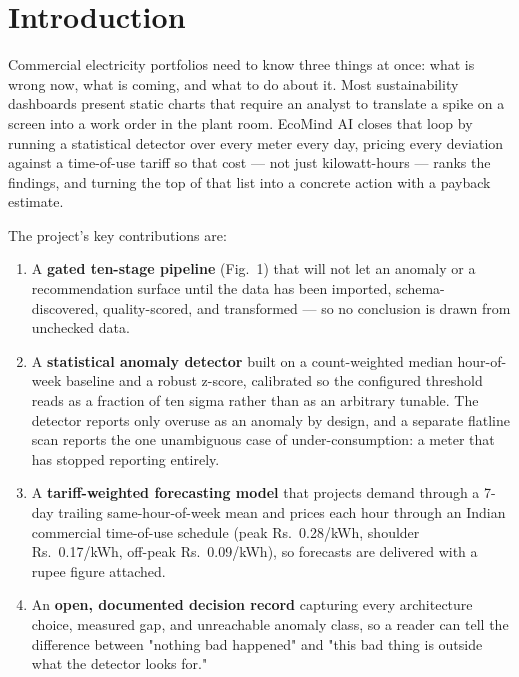 \documentclass[conference, 10pt, a4paper]{IEEEtran}
\begin{document}
\section{Introduction}

Commercial electricity portfolios need to know three things at once: what is
wrong now, what is coming, and what to do about it. Most sustainability
dashboards present static charts that require an analyst to translate a spike
on a screen into a work order in the plant room. EcoMind AI closes that loop
by running a statistical detector over every meter every day, pricing every
deviation against a time-of-use tariff so that cost — not just kilowatt-hours —
ranks the findings, and turning the top of that list into a concrete action
with a payback estimate.

The project's key contributions are:

\begin{enumerate}
\item A \textbf{gated ten-stage pipeline} (Fig.~1) that will not let an
anomaly or a recommendation surface until the data has been imported, schema-
discovered, quality-scored, and transformed — so no conclusion is drawn from
unchecked data.
\item A \textbf{statistical anomaly detector} built on a count-weighted median
hour-of-week baseline and a robust z-score, calibrated so the configured
threshold reads as a fraction of ten sigma rather than as an arbitrary
tunable. The detector reports only overuse as an anomaly by design, and a
separate flatline scan reports the one unambiguous case of under-consumption:
a meter that has stopped reporting entirely.
\item A \textbf{tariff-weighted forecasting model} that projects demand through
a 7-day trailing same-hour-of-week mean and prices each hour through an Indian
commercial time-of-use schedule (peak Rs.~0.28/kWh, shoulder Rs.~0.17/kWh,
off-peak Rs.~0.09/kWh), so forecasts are delivered with a rupee figure
attached.
\item An \textbf{open, documented decision record} capturing every architecture
choice, measured gap, and unreachable anomaly class, so a reader can tell the
difference between "nothing bad happened" and "this bad thing is outside what
the detector looks for."
\end{enumerate}

\end{document}
